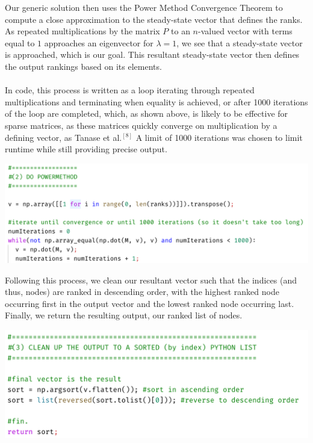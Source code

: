 \documentclass{article}
\begin{document}
    Our generic solution then uses the Power Method Convergence Theorem to compute a close approximation to the steady-state vector that defines the ranks. As repeated multiplications by the matrix $P$ to an $n$-valued vector with terms equal to $1$ approaches an eigenvector for $\lambda = 1$, we see that a steady-state vector is approached, which is our goal. This resultant steady-state vector then defines the output rankings based on its elements.
    \\\\
    \noindent
    In code, this process is written as a loop iterating through repeated multiplications and terminating when equality is achieved, or after 1000 iterations of the loop are completed, which, as shown above, is likely to be effective for sparse matrices, as these matrices quickly converge on multiplication by a defining vector, as Tanase et al.$^{[8]}$ A limit of 1000 iterations was chosen to limit runtime while still providing precise output.
    \begin{center}
        \includegraphics[scale=.6]{snip2}
    \end{center}
    Following this process, we clean our resultant vector such that the indices (and thus, nodes) are ranked in descending order, with the highest ranked node occurring first in the output vector and the lowest ranked node occurring last. Finally, we return the resulting output, our ranked list of nodes. 
    
    \begin{center}
        \includegraphics[scale=.6]{snip3}
    \end{center}
    
\end{document}
